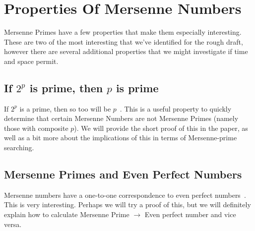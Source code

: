\section{Properties Of Mersenne Numbers}

Mersenne Primes have a few properties that make them especially interesting. These are two of the most interesting that we've identified for the rough draft, however there are several additional properties that we might investigate if time and space permit.

\subsection{If $2^p$ is prime, then $p$ is prime}

If $2^p$ is a prime, then so too will be $p$~\cite{LighNeal}. 
This is a useful property to quickly determine that certain Mersenne Numbers are not Mersenne Primes (namely those with composite $p$). 
We will provide the short proof of this in the paper, as well as a bit more about the
implications of this in terms of Mersenne-prime searching.


\subsection{Mersenne Primes and Even Perfect Numbers}

Mersenne numbers have a one-to-one correspondence to even perfect numbers~\cite{utm.edu}. This is very interesting. Perhaps we will try a proof of this, but we will definitely explain how to calculate Mersenne Prime $\to$ Even perfect number and vice versa.

